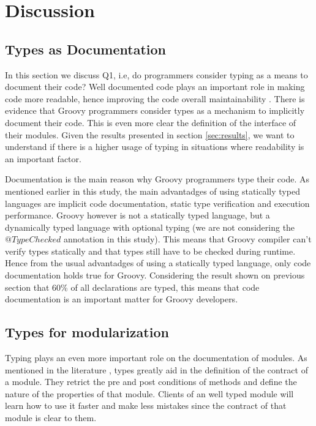 \documentclass[preprint]{sigplanconf}
\begin{document}
%
%
\section{Discussion\label{sec:Discussion}}


\subsection{Types as Documentation}
In this section we discuss Q1, i.e, do programmers consider typing as a means to document their code?
Well documented code plays an important role in making code more readable, hence improving the code overall maintainability \cite{Iso2004}.
There is evidence that Groovy programmers consider types as a mechanism to implicitly document their code.
This is even more clear the definition of the interface of their modules.
Given the results presented in section \ref{sec:results}, we want to understand if there is a higher usage of typing in situations where readability is an important factor. 

Documentation is the main reason why Groovy programmers type their code.
As mentioned earlier in this study, the main advantadges of using statically typed languages are implicit code documentation, static type verification and execution performance.
Groovy however is not a statically typed language, but a dynamically typed language with optional typing (we are not considering the $@TypeChecked$ annotation in this study).
This means that Groovy compiler can't verify types statically and that types still have to be checked during runtime.
Hence from the usual advantadges of using a statically typed language, only code documentation holds true for Groovy.
Considering the result shown on previous section that 60\% of all declarations are typed, this means that code documentation is an important matter for Groovy developers.

\subsection{Types for modularization}
Typing plays an even more important role on the documentation of modules.
As mentioned in the literature \cite{Meyer88, Meijer04, Wadler04, Plosch97, Flanagan2006, Furr09}, types greatly aid in the definition of the contract of a module.
They retrict the pre and post conditions of methods and define the nature of the properties of that module.
Clients of an well typed module will learn how to use it faster and make less mistakes since the contract of that module is clear to them.
\end{document}
